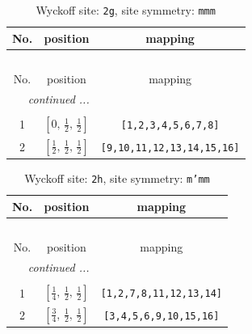 \documentclass[fleqn,8pt]{jsarticle}
\begin{document}
\begin{longtable}{ccc}
\caption{Wyckoff site: {\tt 2g}, site symmetry: {\tt mmm}}
 \\
 \hline \hline
No. & position & mapping \\ \hline \endfirsthead

\multicolumn{2}{l}{\tablename\ \thetable{}} \\
 \hline \hline
No. & position & mapping \\ \hline \endhead

 \hline \hline
\multicolumn{2}{r}{\footnotesize\it continued ...} \\ \endfoot

 \hline \hline
\multicolumn{2}{r}{} \\ \endlastfoot

1 & $\left[ 0,\, \frac{1}{2},\, \frac{1}{2} \right]$ & {\tt [1,2,3,4,5,6,7,8]} \\ \hline
2 & $\left[ \frac{1}{2},\, \frac{1}{2},\, \frac{1}{2} \right]$ & {\tt [9,10,11,12,13,14,15,16]} \\
\end{longtable}
\renewcommand{\arraystretch}{1.2}
\begin{longtable}{ccc}
\caption{Wyckoff site: {\tt 2h}, site symmetry: {\tt m'mm}}
 \\
 \hline \hline
No. & position & mapping \\ \hline \endfirsthead

\multicolumn{2}{l}{\tablename\ \thetable{}} \\
 \hline \hline
No. & position & mapping \\ \hline \endhead

 \hline \hline
\multicolumn{2}{r}{\footnotesize\it continued ...} \\ \endfoot

 \hline \hline
\multicolumn{2}{r}{} \\ \endlastfoot

1 & $\left[ \frac{1}{4},\, \frac{1}{2},\, \frac{1}{2} \right]$ & {\tt [1,2,7,8,11,12,13,14]} \\ \hline
2 & $\left[ \frac{3}{4},\, \frac{1}{2},\, \frac{1}{2} \right]$ & {\tt [3,4,5,6,9,10,15,16]} \\
\end{longtable}
\renewcommand{\arraystretch}{1.2}
\end{document}
